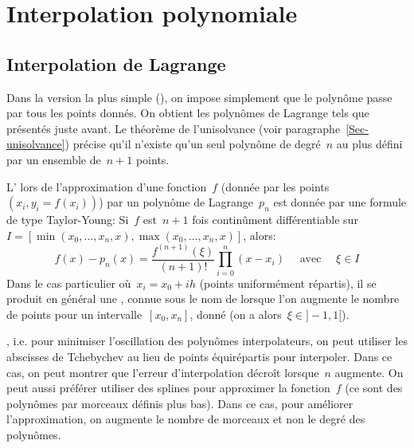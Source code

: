 \medskip\ifVersionDuDocEstVincent\newpage\fi
\section{Interpolation polynomiale} 

\medskip
\subsection{Interpolation de Lagrange} 

Dans la version la plus simple (), on impose simplement que le polynôme passe par tous les points donnés. On obtient les polynômes de Lagrange tels que présentés juste avant.  Le théorème de l'unisolvance (voir paragraphe~\ref{Sec-unisolvance}) précise qu'il n'existe qu'un seul polynôme de degré~$n$ au plus défini par un ensemble de~$n+1$ points. 

L' lors de l'approximation d'une fonction~$f$ (donnée par les points~$(x_i,y_i=f(x_i))$) par un polynôme de Lagrange~$p_n$ est donnée par une formule de type Taylor-Young: Si~$f$ est~$n+1$ fois continûment différentiable sur~$I=[\min(x_0,\ldots,x_n,x),\max(x_0,\ldots,x_n,x)]$, alors:
\begin{equation}
f(x) - p_n(x) = \frac{f^{(n+1)}(\xi)}{(n+1)!} \prod_{i=0}^n (x-x_i) \quad \text{ avec }\quad \xi \in I
\end{equation}
Dans le cas particulier où~$x_i = x_0 + ih$ (points uniformément répartis), il se produit en général une , connue sous le nom de  lorsque l'on augmente le nombre de points pour un intervalle~$[x_0,x_n]$, donné (on a alors~$\xi\in]-1,1[$). 

, i.e. pour minimiser l'oscillation des polynômes interpolateurs, on peut utiliser les abscisses de Tchebychev au lieu de points équirépartis pour interpoler. Dans ce cas, on peut montrer que l'erreur d'interpolation décroît lorsque~$n$ augmente. On peut aussi préférer utiliser des splines pour approximer la fonction~$f$ (ce sont des polynômes par morceaux définis plus bas). Dans ce cas, pour améliorer l'approximation, on augmente le nombre de morceaux et non le degré des polynômes. 
 

